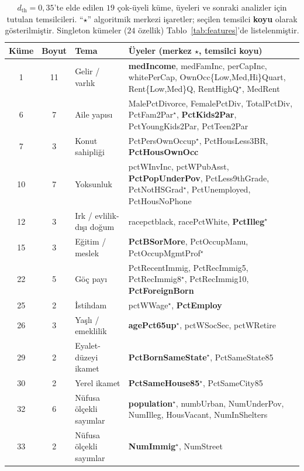 \documentclass{ieeeaccess}
\begin{document}
\begin{table}[!t]
\caption{$d_{\mathrm{th}}=0{,}35$'te elde edilen $19$ çok-üyeli küme, üyeleri ve sonraki analizler için tutulan temsilcileri. ``$\star$'' algoritmik merkezi işaretler; seçilen temsilci \textbf{koyu} olarak gösterilmiştir. Singleton kümeler ($24$ özellik) Tablo~\ref{tab:features}'de listelenmiştir.}
\label{tab:clusters}
\centering
\footnotesize
\begin{tabular}{cclp{7.6cm}}
\toprule
Küme & Boyut & Tema & Üyeler (merkez $\star$, temsilci \textbf{koyu}) \\
\midrule
 1 & 11 & Gelir / varlık                & \textbf{medIncome}, medFamInc, perCapInc, whitePerCap, OwnOcc\{Low,Med,Hi\}Quart, Rent\{Low,Med\}Q, RentHighQ$^\star$, MedRent \\
 6 &  7 & Aile yapısı                   & MalePctDivorce, FemalePctDiv, TotalPctDiv, PctFam2Par$^\star$, \textbf{PctKids2Par}, PctYoungKids2Par, PctTeen2Par \\
 7 &  3 & Konut sahipliği               & PctPersOwnOccup$^\star$, PctHousLess3BR, \textbf{PctHousOwnOcc} \\
10 &  7 & Yoksunluk                     & pctWInvInc, pctWPubAsst, \textbf{PctPopUnderPov}, PctLess9thGrade, PctNotHSGrad$^\star$, PctUnemployed, PctHousNoPhone \\
12 &  3 & Irk / evlilik-dışı doğum      & racepctblack, racePctWhite, \textbf{PctIlleg}$^\star$ \\
15 &  3 & Eğitim / meslek               & \textbf{PctBSorMore}, PctOccupManu, PctOccupMgmtProf$^\star$ \\
22 &  5 & Göç payı                      & PctRecentImmig, PctRecImmig5, PctRecImmig8$^\star$, PctRecImmig10, \textbf{PctForeignBorn} \\
25 &  2 & İstihdam                      & pctWWage$^\star$, \textbf{PctEmploy} \\
26 &  3 & Yaşlı / emeklilik             & \textbf{agePct65up}$^\star$, pctWSocSec, pctWRetire \\
29 &  2 & Eyalet-düzeyi ikamet          & \textbf{PctBornSameState}$^\star$, PctSameState85 \\
30 &  2 & Yerel ikamet                  & \textbf{PctSameHouse85}$^\star$, PctSameCity85 \\
32 &  6 & Nüfusa ölçekli sayımlar       & \textbf{population}$^\star$, numbUrban, NumUnderPov, NumIlleg, HousVacant, NumInShelters \\
33 &  2 & Nüfusa ölçekli sayımlar       & \textbf{NumImmig}$^\star$, NumStreet \\

\end{tabular}
\end{table}
\end{document}
